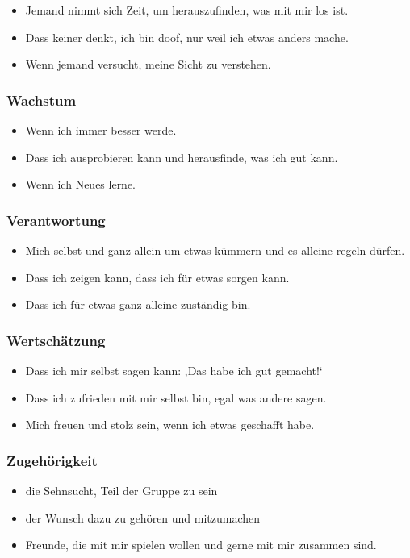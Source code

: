 \begin{itemize}
  \item Jemand nimmt sich Zeit, um herauszufinden, was mit mir los ist.
  \item Dass keiner denkt, ich bin doof, nur weil ich etwas anders mache.
  \item Wenn jemand versucht, meine Sicht zu verstehen.
\end{itemize}


\subsubsection{Wachstum}

\begin{itemize}
  \item Wenn ich immer besser werde.
  \item Dass ich ausprobieren kann und herausfinde, was ich gut kann.
  \item Wenn ich Neues lerne.
\end{itemize}


\subsubsection{Verantwortung}

\begin{itemize}
  \item Mich selbst und ganz allein um etwas kümmern und es alleine regeln dürfen.
  \item Dass ich zeigen kann, dass ich für etwas sorgen kann.
  \item Dass ich für etwas ganz alleine zuständig bin.
\end{itemize}


\subsubsection{Wertschätzung}

\begin{itemize}
  \item Dass ich mir selbst sagen kann: ‚Das habe ich gut gemacht!‘
  \item Dass ich zufrieden mit mir selbst bin, egal was andere sagen.
  \item Mich freuen und stolz sein, wenn ich etwas geschafft habe.
\end{itemize}


\subsubsection{Zugehörigkeit}

\begin{itemize}
  \item die Sehnsucht, Teil der Gruppe zu sein
  \item der Wunsch dazu zu gehören und mitzumachen
  \item Freunde, die mit mir spielen wollen und gerne mit mir zusammen sind.
\end{itemize}
